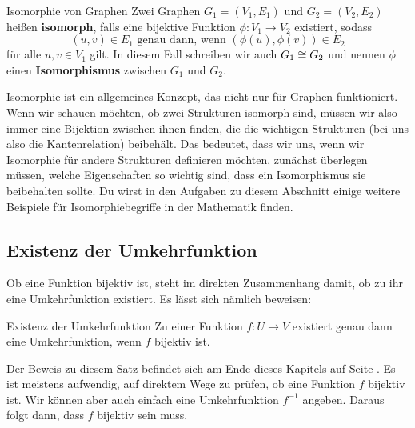 \documentclass[../../main.tex]{subfiles}
\begin{document}
\begin{definition}{Isomorphie von Graphen}
    Zwei Graphen $G_1=(V_1,E_1)$ und $G_2=(V_2,E_2)$ heißen \textbf{isomorph}, falls eine bijektive Funktion 
    $\phi\colon V_1\rightarrow V_2$ existiert, sodass
    \[(u,v)\in E_1\text{ genau dann, wenn }(\phi(u),\phi(v))\in E_2\]
    für alle $u,v\in V_1$ gilt. In diesem Fall schreiben wir auch $G_1\cong G_2$ und nennen $\phi$ einen \textbf{Isomorphismus} zwischen $G_1$
    und $G_2$.
\end{definition}

Isomorphie ist ein allgemeines Konzept, das nicht nur für Graphen funktioniert. Wenn wir schauen möchten, ob zwei 
Strukturen isomorph sind, müssen wir also immer eine Bijektion zwischen ihnen finden,
die die wichtigen Strukturen (bei uns also die Kantenrelation) beibehält. Das bedeutet, dass wir uns, wenn wir Isomorphie für
andere Strukturen definieren möchten, zunächst überlegen müssen, welche Eigenschaften so wichtig sind, dass ein Isomorphismus sie beibehalten
sollte. Du wirst in den Aufgaben zu diesem Abschnitt einige weitere Beispiele für Isomorphiebegriffe in der Mathematik finden.

\subsection*{Existenz der Umkehrfunktion}
Ob eine Funktion bijektiv ist, steht im direkten Zusammenhang damit, ob zu ihr eine Umkehrfunktion existiert. Es lässt sich nämlich beweisen:

\begin{theorem}{Existenz der Umkehrfunktion}
    Zu einer Funktion $f\colon U\rightarrow V$ existiert genau dann eine Umkehrfunktion, wenn $f$ bijektiv ist.
\end{theorem}

Der Beweis zu diesem Satz befindet sich am Ende dieses Kapitels auf Seite \pageref{proof:existenceOfInverseMap}.
Es ist meistens aufwendig, auf direktem Wege zu prüfen, ob eine Funktion $f$ bijektiv ist. Wir können aber auch einfach
eine Umkehrfunktion $f^{-1}$ angeben. Daraus folgt dann, dass $f$ bijektiv sein muss.

\begin{example}{}
\end{example}
\end{document}

